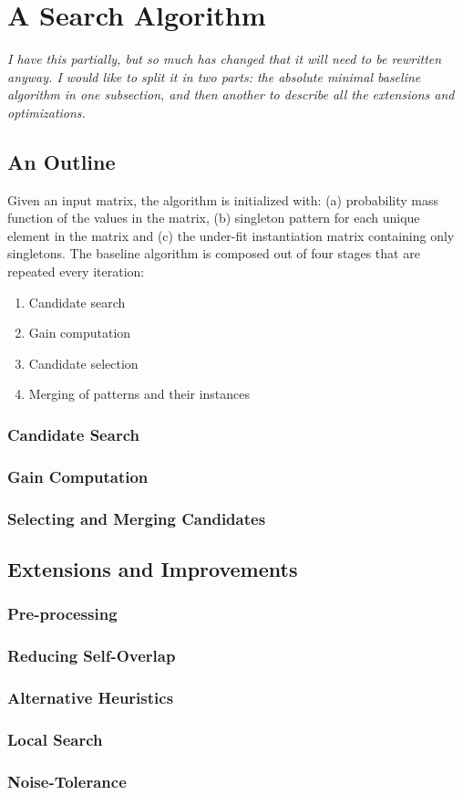 \documentclass{llncs}
\begin{document}
\section{A Search Algorithm}

\emph{I have this partially, but so much has changed that it will need to be rewritten anyway. I would like to split it in two parts: the absolute minimal baseline algorithm in one subsection, and then another to describe all the extensions and optimizations.}\\

\subsection{An Outline}

Given an input matrix, the algorithm is initialized with: (a) probability mass function of the values in the matrix, (b) singleton pattern for each unique element in the matrix and (c) the under-fit instantiation matrix containing only singletons.  The baseline algorithm is composed out of four stages that are repeated every iteration:
\begin{enumerate}
\item Candidate search
\item Gain computation
\item Candidate selection
\item Merging of patterns and their instances
\end{enumerate}

\subsubsection{Candidate Search}
\subsubsection{Gain Computation}
\subsubsection{Selecting and Merging Candidates}

\subsection{Extensions and Improvements}

\subsubsection{Pre-processing}
\subsubsection{Reducing Self-Overlap}
\subsubsection{Alternative Heuristics}
\subsubsection{Local Search}
\subsubsection{Noise-Tolerance}
\end{document}
